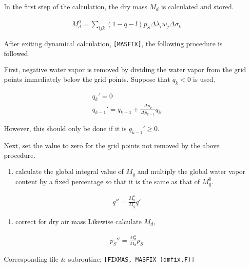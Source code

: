 In the first step of the calculation, the dry mass \(M_d\) is calculated and stored.

\begin{eqnarray}
  M_d^0 = \sum_{ijk} (1-q-l) p_S \Delta\lambda_i w_j \Delta\sigma_k
\end{eqnarray}

After exiting dynamical calculation, \texttt{{[}MASFIX{]}}, the following procedure is followed.

First, negative water vapor is removed by dividing the water vapor from the grid points immediately below the grid points. Suppose that \(q_k < 0\) is used,

\begin{eqnarray}
        q_k'      =  0          \\
        q_{k-1}'  =  q_{k-1} + \frac{\Delta p_k}{\Delta p_{k-1}} q_k
\end{eqnarray}

However, this should only be done if it is \(q_{k-1}' \ge 0\).

Next, set the value to zero for the grid points not removed by the above procedure.

\begin{enumerate}
\def\labelenumi{\arabic{enumi}.}
\setcounter{enumi}{2}
\tightlist
\item
  calculate the global integral value of \(M_q\) and multiply the global water vapor content by a fixed percentage so that it is the same as that of \(M_q^0\).
\end{enumerate}

\begin{eqnarray}
        q'' = \frac{M_q^0}{M_q} q'
\end{eqnarray}

\begin{enumerate}
\def\labelenumi{\arabic{enumi}.}
\setcounter{enumi}{3}
\tightlist
\item
  correct for dry air mass Likewise calculate \(M_d\),
\end{enumerate}

\begin{eqnarray}
        p_S'' = \frac{M_d^0}{M_d} p_S
\end{eqnarray}

Corresponding file \& subroutine: \texttt{{[}FIXMAS,\ MASFIX\ (dmfix.F){]}}

